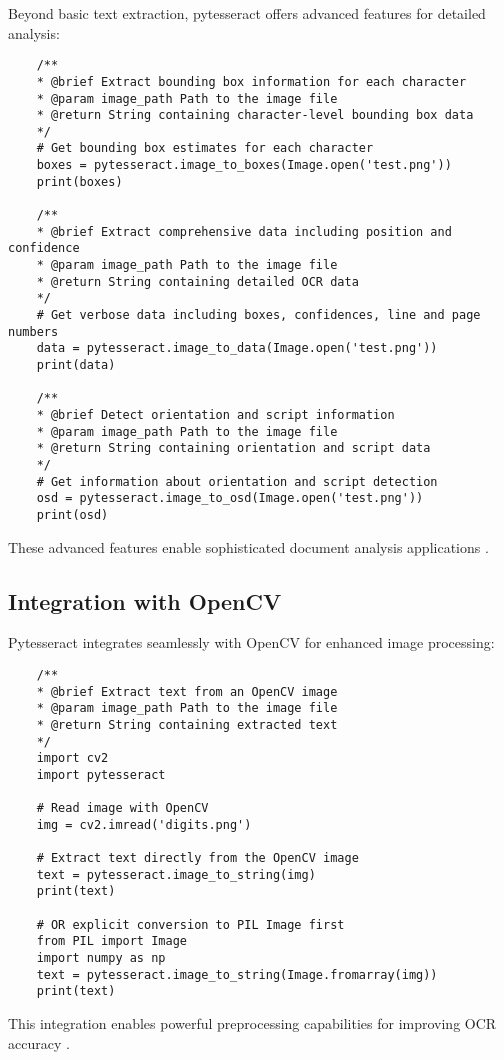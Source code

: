 Beyond basic text extraction, pytesseract offers advanced features for detailed analysis:

\begin{verbatim}
	/**
	* @brief Extract bounding box information for each character
	* @param image_path Path to the image file
	* @return String containing character-level bounding box data
	*/
	# Get bounding box estimates for each character
	boxes = pytesseract.image_to_boxes(Image.open('test.png'))
	print(boxes)
	
	/**
	* @brief Extract comprehensive data including position and confidence
	* @param image_path Path to the image file
	* @return String containing detailed OCR data
	*/
	# Get verbose data including boxes, confidences, line and page numbers
	data = pytesseract.image_to_data(Image.open('test.png'))
	print(data)
	
	/**
	* @brief Detect orientation and script information
	* @param image_path Path to the image file
	* @return String containing orientation and script data
	*/
	# Get information about orientation and script detection
	osd = pytesseract.image_to_osd(Image.open('test.png'))
	print(osd)
\end{verbatim}

These advanced features enable sophisticated document analysis applications \cite{GeekyAnts:2023}.

\subsection{Integration with OpenCV}
\label{subsec:opencv_integration}

Pytesseract integrates seamlessly with OpenCV for enhanced image processing:

\begin{verbatim}
	/**
	* @brief Extract text from an OpenCV image
	* @param image_path Path to the image file
	* @return String containing extracted text
	*/
	import cv2
	import pytesseract
	
	# Read image with OpenCV
	img = cv2.imread('digits.png')
	
	# Extract text directly from the OpenCV image
	text = pytesseract.image_to_string(img)
	print(text)
	
	# OR explicit conversion to PIL Image first
	from PIL import Image
	import numpy as np
	text = pytesseract.image_to_string(Image.fromarray(img))
	print(text)
\end{verbatim}

This integration enables powerful preprocessing capabilities for improving OCR accuracy \cite{GeekyAnts:2023}.


